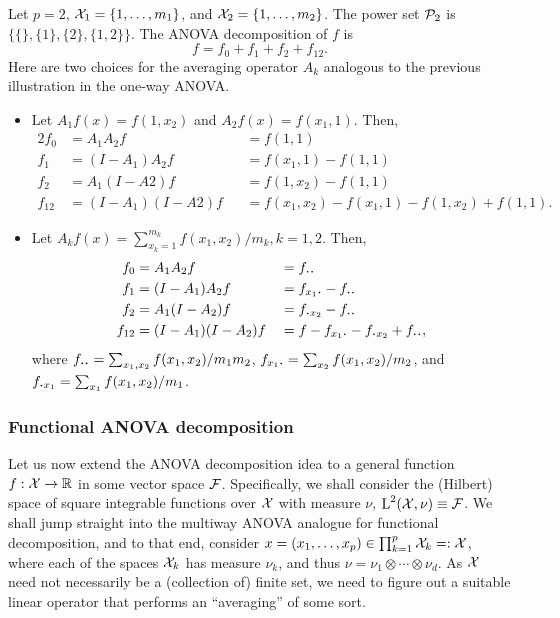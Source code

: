 \begin{example}
  Let $p=2$, ${\mathcal X}_1=\{1,\dots,m_1\}$, and ${\mathcal X}_2=\{1,\dots,m_2\}$.
  The power set ${\mathcal P}_2$ is $\big\{ \{\}, \{1\}, \{2\}, \{1,2\} \big\}$.
  The ANOVA decomposition of $f$ is
  \[
    f = f_0 + f_1 + f_2 + f_{12}.
  \]
  Here are two choices for the averaging operator $A_k$ analogous to the previous illustration in the one-way ANOVA.
  \begin{itemize}
    \item Let $A_1f(x) = f(1,x_2)$ and $A_2f(x) = f(x_1,1)$. Then,
    \begin{alignat*}{2}
      f_0 &= A_1A_2 f          &&= f(1,1) \\
      f_1 &= (I-A_1)A_2f       &&= f(x_1,1) - f(1,1) \\
      f_2 &= A_1(I-A2)f        &&= f(1,x_2) - f(1,1) \\
      f_{12} &= (I-A_1)(I-A2)f &&= f(x_1,x_2) - f(x_1,1) - f(1,x_2) + f(1,1).
    \end{alignat*}
    \item Let $A_kf(x) = \sum_{x_k=1}^{m_k} f(x_1,x_2) / m_k, k=1,2$. Then,
    \begin{alignat*}{2}
      f_0 &= A_1A_2 f          &&= f_{\bigcdot\bigcdot} \\
      f_1 &= (I-A_1)A_2f       &&= f_{x_1\bigcdot} - f_{\bigcdot\bigcdot} \\
      f_2 &= A_1(I-A_2)f        &&= f_{\bigcdot x_2} - f_{\bigcdot\bigcdot} \\
      f_{12} &= (I-A_1)(I-A_2)f &&= f - f_{x_1\bigcdot} - f_{\bigcdot x_2} + f_{\bigcdot\bigcdot},
    \end{alignat*}
    where $f_{\bigcdot\bigcdot} = \sum_{x_1,x_2} f(x_1,x_2) / m_1m_2$, $ f_{x_1\bigcdot} = \sum_{x_2} f(x_1,x_2)/m_2$, and \newline $f_{\bigcdot x_1} = \sum_{x_1} f(x_1,x_2)/m_1$.
  \end{itemize}
\end{example}

\subsubsection{Functional ANOVA decomposition}

Let us now extend the ANOVA decomposition idea to a general function $f:{\mathcal X}\to\mathbb{R}$ in some vector space ${\mathcal F}$.
Specifically, we shall consider the (Hilbert) space of square integrable functions over ${\mathcal X}$ with measure $\nu$, $\text{L}^2({\mathcal X},\nu) \equiv {\mathcal F}$.
We shall jump straight into the multiway ANOVA analogue for functional decomposition, and to that end, consider $x=(x_1,\dots,x_p) \in \prod_{k=1}^p {\mathcal X}_k =: {\mathcal X}$, where each of the spaces ${\mathcal X}_k$ has measure $\nu_k$, and thus $\nu=\nu_1\otimes\cdots\otimes\nu_d$.
As ${\mathcal X}$ need not necessarily be a (collection of) finite set, we need to figure out a suitable linear operator that performs an ``averaging'' of some sort.

